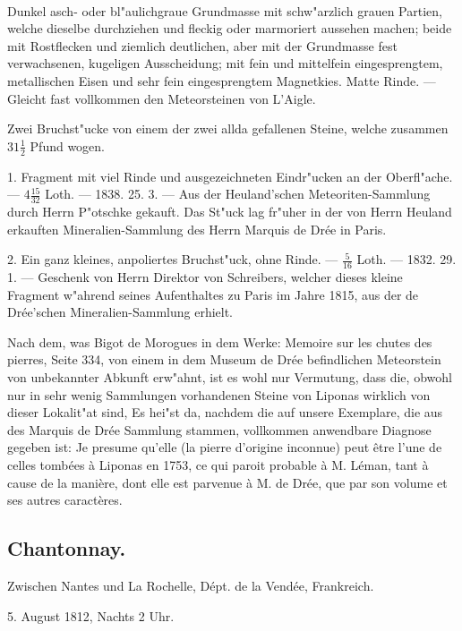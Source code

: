 \documentclass[a4paper, 11pt, oneside, polutonikogreek, german]{article}
\begin{document}
\paragraph{}
Dunkel asch- oder bl"aulichgraue Grundmasse mit schw"arzlich grauen Partien, welche dieselbe durchziehen und fleckig oder marmoriert aussehen machen; beide mit Rostflecken und ziemlich deutlichen, aber mit der Grundmasse fest verwachsenen, kugeligen Ausscheidung; mit fein und mittelfein eingesprengtem, metallischen Eisen und sehr fein eingesprengtem Magnetkies. Matte Rinde. --- Gleicht fast vollkommen den Meteorsteinen von L'Aigle.

Zwei Bruchst"ucke von einem der zwei allda gefallenen Steine, welche zusammen $31\frac{1}{2}$ Pfund wogen.

1. Fragment mit viel Rinde und ausgezeichneten Eindr"ucken an der Oberfl"ache. --- $4\frac{15}{32}$ Loth. --- 1838. 25. 3. --- Aus der Heuland'schen Meteoriten-Sammlung durch Herrn P"otschke gekauft. Das St"uck lag fr"uher in der von Herrn Heuland erkauften Mineralien-Sammlung des Herrn Marquis de Drée in Paris.

2. Ein ganz kleines, anpoliertes Bruchst"uck, ohne Rinde. --- $\frac{5}{16}$ Loth. --- 1832. 29. 1. --- Geschenk von Herrn Direktor von Schreibers, welcher dieses kleine Fragment w"ahrend seines Aufenthaltes zu Paris im Jahre 1815, aus der de Drée'schen Mineralien-Sammlung erhielt.

\setlength{\leftskip}{10mm}
\setlength{\parindent}{0pt}

{\footnotesize Nach dem, was Bigot de Morogues in dem Werke: Memoire sur les chutes des pierres, Seite 334, von einem in dem Museum de Drée befindlichen Meteorstein von unbekannter Abkunft erw"ahnt, ist es wohl nur Vermutung, dass die, obwohl nur in sehr wenig Sammlungen vorhandenen Steine von Liponas wirklich von dieser Lokalit"at sind, Es hei"st da, nachdem die auf unsere Exemplare, die aus des Marquis de Drée Sammlung stammen, vollkommen anwendbare Diagnose gegeben ist: Je presume qu'elle (la pierre d'origine inconnue) peut être l'une de celles tombées à Liponas en 1753, ce qui paroit probable à M. Léman, tant à cause de la manière, dont elle est parvenue à M. de Drée, que par son volume et ses autres caractères.}

\setlength{\leftskip}{0pt}
\setlength{\parindent}{20pt}

\subsection{Chantonnay.}
\begin{center}
\small
Zwischen Nantes und La Rochelle, Dépt. de la Vendée, Frankreich.

5. August 1812, Nachts 2 Uhr.
\end{center}
\end{document}
